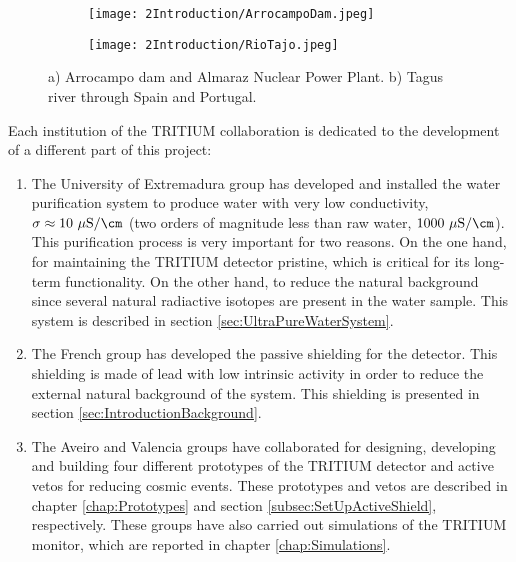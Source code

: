 \begin{figure}
\centering
    \begin{subfigure}[b]{0.45\textwidth}
    \centering
    \texttt{[image: 2Introduction/ArrocampoDam.jpeg]}  
    \caption{\label{subfig:Arrocampo_Dam}}
    \end{subfigure}
    \hfill
    \begin{subfigure}[b]{0.45\textwidth}
    \centering
    \texttt{[image: 2Introduction/RioTajo.jpeg]}  
    \caption{\label{subfig:TajusRiver}}
    \end{subfigure}
 \caption{a) Arrocampo dam and Almaraz Nuclear Power Plant. b) Tagus river through Spain and Portugal.}
 \label{fig:Arrocampo}
\end{figure}

Each institution of the TRITIUM collaboration is dedicated to the development of a different part of this project:

\begin{enumerate}
\item{} The University of Extremadura group has developed and installed the water purification system to produce water with very low conductivity, $\sigma \approx 10~\mu\text{S}/\cm$ (two orders of magnitude less than raw water, $1000~\mu\text{S}/\cm$). This purification process is very important for two reasons. On the one hand, for maintaining the TRITIUM detector pristine, which is critical for its long-term functionality. On the other hand, to reduce the natural background since several natural radiactive isotopes are present in the water sample. This system is described in section \ref{sec:UltraPureWaterSystem}.

\item{} The French group has developed the passive shielding for the detector. This shielding is made of lead with low intrinsic activity in order to reduce the external natural background of the system. This shielding is presented in section \ref{sec:IntroductionBackground}.

\item{} The Aveiro and Valencia groups have collaborated for designing, developing and building four different prototypes of the TRITIUM detector and active vetos for reducing cosmic events. These prototypes and vetos are described in chapter \ref{chap:Prototypes} and section \ref{subsec:SetUpActiveShield}, respectively. These groups have also carried out simulations of the TRITIUM monitor, which are reported in chapter \ref{chap:Simulations}.

\end{enumerate}

